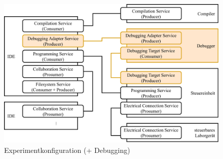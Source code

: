 \begin{figure}[tbp]
    \centering
    \includegraphics[width=\textwidth]{diagrams/experimentkonfigurationen/Experimentkonfiguration-04.drawio.pdf}
    \caption{Experimentkonfiguration (+ Debugging)}
    \label{figure:experimentkonfiguration:debugging}
\end{figure}